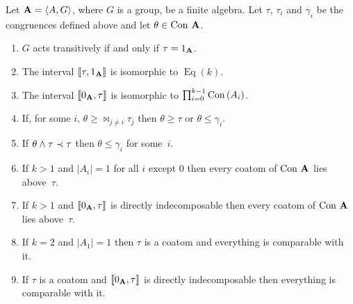 \begin{theorem}\label{thm:intrans}
Let $\mathbf{A} = \langle A,G\rangle$, where $G$ is a group, be a finite algebra. 
Let $\tau$, $\tau_i$ and $\gamma_i$
be the congruences defined above and let $\theta \in \operatorname{Con\,} \mathbf{A}$.
\begin{enumerate}
\item\label{item1}
$G$ acts transitively if and only if $\tau = 1_{\mathbf{A}}$.
\item \label{item2}
The interval $\llbracket\tau,1_{\mathbf{A}}\rrbracket$ is isomorphic to $\operatorname{Eq}(k)$.
\item \label{item3}
The interval $\llbracket 0_{\mathbf{A}},\tau\rrbracket$ is isomorphic to $\prod_{i=0}^{k-1} \operatorname{Con\,}(A_i)$.
\item\label{item4}
If, for some $i$, $\theta \ge \Join_{j \ne i} \tau_j$ then $\theta \ge \tau$
or $\theta \le \gamma_i$.
\item\label{item5}
If $\theta\wedge \tau \prec \tau$  then $\theta \le \gamma_i$ for some~$i$.
\item\label{item6}
If $k>1$ and $|A_i| = 1$ for all $i$ except $0$ then every coatom of $\operatorname{Con\,} \mathbf{A}$
lies above~$\tau$.
\item\label{item7}
If $k>1$ and $\llbracket 0_{\mathbf{A}},\tau\rrbracket$ is directly indecomposable 
then every coatom of $\operatorname{Con\,} \mathbf{A}$ lies above~$\tau$.
\item\label{item8}
If $k = 2$ and $|A_1| = 1$ then $\tau$ is a coatom and 
everything is comparable with it.
\item\label{item9}
If $\tau$ is a coatom and $\llbracket 0_{\mathbf{A}},\tau\rrbracket$ is directly indecomposable
then everything is comparable with it.
\end{enumerate}
\end{theorem}

